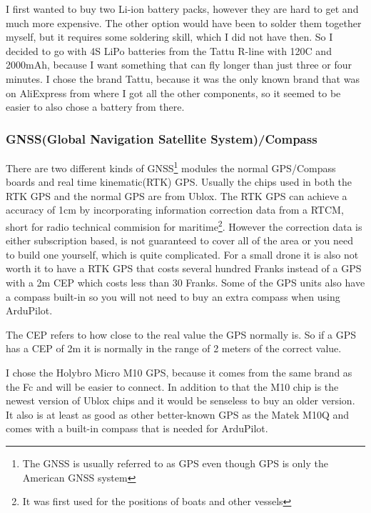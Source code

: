 \documentclass{article}
\begin{document}
	I first wanted to buy two \gls{Li-ion} battery packs, however they are hard to get and much more expensive. The other option would have been to solder them together myself, but it requires some soldering skill, which I did not have then. So I decided to go with 4S \gls{LiPo} batteries from the Tattu R-line with 120C and 2000mAh\cite{tattu}, because I want something that can fly longer than just three or four minutes. I chose the brand Tattu, because it was the only known brand that was on AliExpress from where I got all the other components, so it seemed to be easier to also chose a battery from there. 
	

	\subsubsection{GNSS(Global Navigation Satellite System)/Compass}
	There are two different kinds of GNSS\footnote{The GNSS is usually referred to as GPS even though GPS is only the American GNSS system} modules the normal GPS/Compass boards and real time kinematic(RTK) GPS. Usually the chips used in both the RTK GPS and the normal GPS are from Ublox. The RTK GPS can achieve a accuracy of 1cm by incorporating information correction data from a RTCM, short for radio technical commision for maritime\footnote{It was first used for the positions of boats and other vessels}. However the correction data is either subscription based, is not guaranteed to cover all of the area or you need to build one yourself, which is quite complicated\cite{rtkgps}. For a small drone it is also not worth it to have a RTK GPS that costs several hundred Franks instead of a GPS with a 2m \gls{CEP} which costs less than 30 Franks. Some of the GPS units also have a compass built-in so you will not need to buy an extra compass when using ArduPilot. 
	\begin{Explanation}
		\item The \gls{CEP} refers to how close to the real value the \gls{GPS} normally is. So if a \gls{GPS} has a \gls{CEP}
		of 2m it is normally in the range of 2 meters of the correct value. \cite{CEP}
	\end{Explanation}
	
	I chose the Holybro Micro M10 GPS\cite{holybrom10micro}, because it comes from the same brand as the Fc and will be easier to connect. In addition to that the M10 chip is the newest version of Ublox chips and it would be senseless to buy an older version. It also is at least as good as other better-known GPS as the Matek M10Q\cite{gpstest} and comes with a built-in compass that is needed for ArduPilot.
\end{document}
